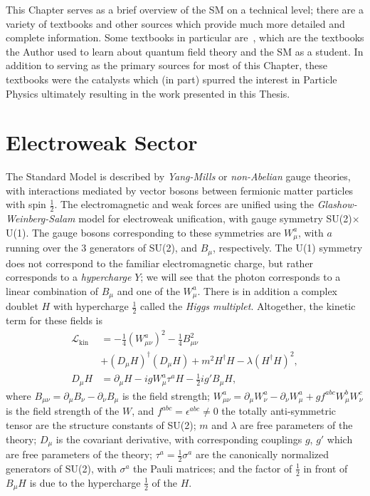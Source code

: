 This Chapter serves as a brief overview of the SM on a technical level; there are a variety of textbooks and other sources which provide much more detailed and complete information.
Some textbooks in particular are~\cite{Schwartz:2013pla,Peskin:1995ev,Weinberg:1995mt,griffiths_particles}, which are the textbooks the Author used to learn about quantum field theory and the SM as a student.
In addition to serving as the primary sources for most of this Chapter, these textbooks were the catalysts which (in part) spurred the interest in Particle Physics ultimately resulting in the work presented in this Thesis.

\section{Electroweak Sector}
\label{sec:SM:EW}
The Standard Model is described by \textit{Yang-Mills} or \textit{non-Abelian} gauge theories, with interactions mediated by vector bosons between fermionic matter particles with spin $\frac{1}{2}$.
The electromagnetic and weak forces are unified using the \textit{Glashow-Weinberg-Salam} model for electroweak unification, with gauge symmetry SU(2)$\times$U(1).
The gauge bosons corresponding to these symmetries are $W_\mu^a$, with $a$ running over the $3$ generators of SU(2), and $B_\mu$, respectively.
The U(1) symmetry does not correspond to the familiar electromagnetic charge, but rather corresponds to a \textit{hypercharge} $Y$; we will see that the photon corresponds to a linear combination of $B_\mu$ and one of the $W_\mu^a$.
There is in addition a complex doublet $H$ with hypercharge $\frac{1}{2}$ called the \textit{Higgs multiplet}.
Altogether, the kinetic term for these fields is
\begin{align}
  \mathcal{L}_\text{kin} &= -\frac{1}{4}(W_{\mu\nu}^a)^2 -\frac{1}{4}B_{\mu\nu}^2\nonumber\\
              &+(D_\mu H)^\dagger(D_\mu H) + m^2 H^\dagger H - \lambda (H^\dagger H)^2,\\
              D_\mu H &= \partial_\mu H - igW_\mu^a\tau^aH - \frac{1}{2}ig'B_\mu H,
\end{align}
where $B_{\mu\nu} = \partial_\mu B_\nu - \partial_\nu B_\mu$ is the field strength;
$W_{\mu\nu}^a = \partial_\mu W_\nu^a - \partial_\nu W_\mu^a + gf^{abc}W_\mu^bW_\nu^c$ is the field strength of the $W$, and $f^{abc} = \epsilon^{abc} \ne 0$ the totally anti-symmetric tensor are the structure constants of SU(2);
$m$ and $\lambda$ are free parameters of the theory;
$D_\mu$ is the covariant derivative, with corresponding couplings $g$, $g'$ which are free parameters of the theory;
$\tau^a = \frac{1}{2}\sigma^a$ are the canonically normalized generators of SU(2), with $\sigma^a$ the Pauli matrices;
and the factor of $\frac{1}{2}$ in front of $B_\mu H$ is due to the hypercharge $\frac{1}{2}$ of the $H$.

